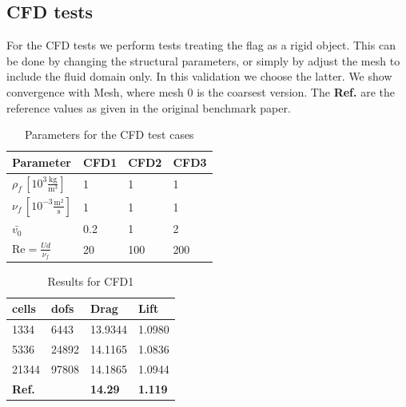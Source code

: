 \subsection{CFD tests}
For the CFD tests we perform tests treating the flag as a rigid object. This can be done by changing the structural parameters, or simply by adjust the mesh to include the fluid domain only. In this validation we choose the latter. We show convergence with Mesh, where mesh 0 is the coarsest version. The \textbf{Ref.} are the reference values as given in the original benchmark paper. 

\begin{table}[!ht]
\begin{center}
  \begin{tabular}{|l | l | l | l|} \hline
	Parameter & CFD1 & CFD2 & CFD3 \\ \hline
    $\rho_f\, [10^3\frac{\text{kg}}{\text{m}^3}]$  & 1 & 1 & 1 \\   \hline
    $\nu_f\, [10^{-3}\frac{\text{m}^2}{\text{s}}]$ & 1 & 1 & 1 \\ \hline
    $\bar{v_0}$ & 0.2 & 1 & 2   \\ \hline \hline
    $\text{Re} = \frac{Ud}{\nu_f}$ & 20 & 100 & 200 \\ \hline 
    \hline
  \end{tabular}
  \caption{Parameters for the CFD test cases}
\end{center}
\end{table}
\begin{table}[!ht]
\begin{center}
  \begin{tabular}{|l | l | l | l|} \hline
	cells & dofs & Drag & Lift \\ \hline
    1334  & 6443 & 13.9344 & 1.0980  \\   \hline
    5336 & 24892 & 14.1165 & 1.0836 \\ \hline
    21344 & 97808 & 14.1865 & 1.0944  \\ \hline \hline
    \textbf{Ref.}  & & \textbf{14.29} & \textbf{1.119} \\ \hline 
    \hline
  \end{tabular}
\end{center}
\caption{Results for CFD1}
\end{table}

